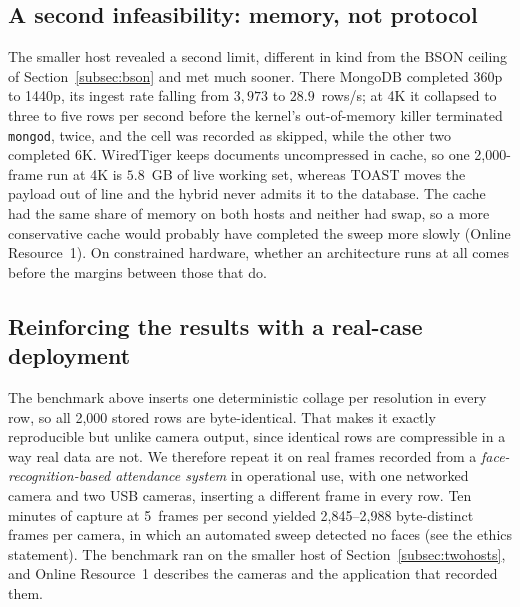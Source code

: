\documentclass[pdflatex,sn-basic]{sn-jnl}%
\begin{document}
\subsection{A second infeasibility: memory, not protocol}\label{subsec:memory}
{\color{markup}The smaller host revealed a second limit, different in kind from the BSON ceiling of Section~\ref{subsec:bson} and met much sooner.} {\color{markup}There MongoDB completed 360p to 1440p, its ingest rate falling from $3{,}973$ to $28.9$~rows/s; at 4K it collapsed to three to five rows per second before the kernel's out-of-memory killer terminated \texttt{mongod}, twice, and the cell was recorded as skipped, while the other two completed 6K.} {\color{markup}WiredTiger keeps documents uncompressed in cache, so one 2{,}000-frame run at 4K is $5.8$~GB of live working set, whereas TOAST moves the payload out of line and the hybrid never admits it to the database.} {\color{markup}The cache had the same share of memory on both hosts and neither had swap, so a more conservative cache would probably have completed the sweep more slowly (Online Resource~1).} {\color{markup}On constrained hardware, whether an architecture runs at all comes before the margins between those that do.}

\subsection{Reinforcing the results with a real-case deployment}\label{subsec:realframes}
{\color{markup}The benchmark above inserts one deterministic collage per resolution in every row, so all 2{,}000 stored rows are byte-identical.} {\color{markup}That makes it exactly reproducible but unlike camera output, since identical rows are compressible in a way real data are not.} {\color{markup}We therefore repeat it on real frames recorded from a \emph{face-recognition-based attendance system} in operational use, with one networked camera and two USB cameras, inserting a different frame in every row.} {\color{markup}Ten minutes of capture at 5~frames per second yielded 2{,}845--2{,}988 byte-distinct frames per camera, in which an automated sweep detected no faces (see the ethics statement).} {\color{markup}The benchmark ran on the smaller host of Section~\ref{subsec:twohosts}, and Online Resource~1 describes the cameras and the application that recorded them.}
\end{document}
